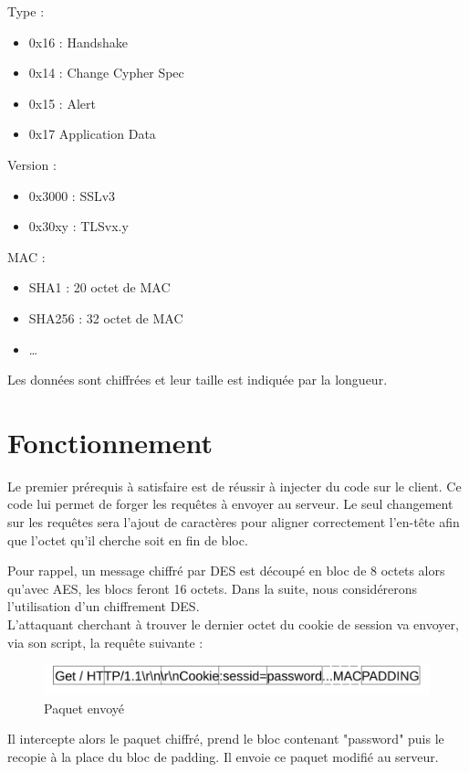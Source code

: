 Type :
\begin{itemize}
\item 0x16 : Handshake
\item 0x14 : Change Cypher Spec
\item 0x15 : Alert
\item 0x17 Application Data
\end{itemize}

Version :
\begin{itemize}
\item 0x3000 : SSLv3
\item 0x30xy : TLSvx.y
\end{itemize}

MAC :
\begin{itemize}
\item SHA1 : 20 octet de MAC
\item SHA256 : 32 octet de MAC
\item \dots
\end{itemize}
Les données sont chiffrées et leur taille est indiquée par
la longueur.

\section{Fonctionnement}
\label{sec:fct}

Le premier prérequis à satisfaire est de réussir à injecter du code sur le client. Ce code lui permet 
de forger les requêtes à envoyer au serveur. Le seul changement sur les requêtes sera l'ajout de caractères pour
aligner correctement l'en-tête afin que l'octet qu'il cherche soit en fin de bloc.

Pour rappel, un message chiffré par DES est découpé en bloc de 8 octets alors qu'avec AES, les blocs feront 16 octets. Dans la suite, nous considérerons l'utilisation d'un chiffrement DES.\\ 

L'attaquant cherchant à trouver le dernier octet du cookie de session va envoyer, via son script, la requête suivante :

\begin{figure}[h]
\label{fig:packet1}
\centering
\includegraphics[scale=0.5]{Packet1}
\caption{Paquet envoyé}
\end{figure}

Il intercepte alors le paquet chiffré, prend le bloc contenant "password" puis le recopie à la
place du bloc de padding. Il envoie ce paquet modifié au serveur. 

